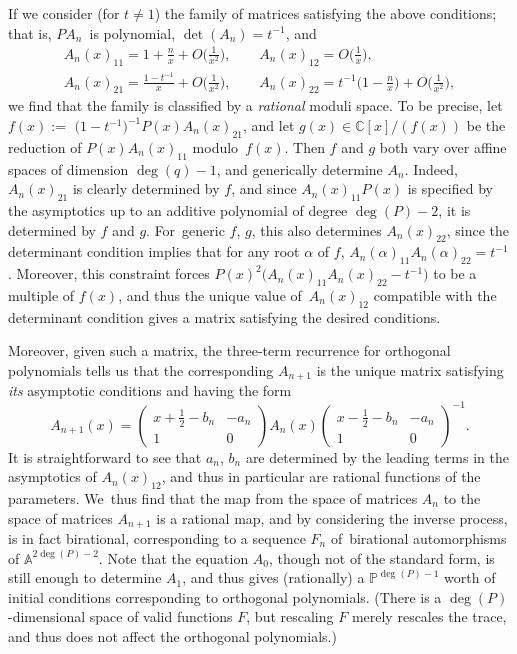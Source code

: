\documentclass[10pt,a4paper]{amsart}
\newcommand{\C}{\mathbb{C}}
\theoremstyle{definition}
\numberwithin{equation}{section}
\begin{document}
If we consider (for $t\ne 1$) the family of matrices satisfying the above
conditions; that is, $PA_n$~is polynomial, $\det(A_n)=t^{-1}$, and
\begin{gather*}
A_n(x)_{11} = 1+\tfrac{n}{x}+O\big(\tfrac{1}{x^2}\big),\qquad
A_n(x)_{12} = O\big(\tfrac{1}{x}\big),\\
A_n(x)_{21} = \tfrac{1-t^{-1}}{x} + O\big(\tfrac{1}{x^2}\big),\qquad
A_n(x)_{22} = t^{-1}\big(1-\tfrac{n}{x}\big)+O\big(\tfrac{1}{x^2}\big),
\end{gather*}
we find that the family is classified by a {\em rational} moduli space. To
be precise, let $f(x):=$ \mbox{$\big(1-t^{-1}\big)^{-1}P(x)A_n(x)_{21}$}, and let $g(x)\in
\C[x]/(f(x))$ be the reduction of $P(x)A_n(x)_{11}$ modu\-lo~$f(x)$. Then
$f$ and $g$ both vary over affine spaces of dimension $\deg(q)-1$, and
generically determine $A_n$. Indeed, $A_n(x)_{21}$ is clearly determined
by $f$, and since $A_n(x)_{11}P(x)$ is specified by the asymptotics up to
an additive polynomial of degree $\deg(P)-2$, it is determined by $f$ and
$g$. For~generic $f$, $g$, this also determines $A_n(x)_{22}$, since the
determinant condition implies that for any root $\alpha$ of $f$,
$A_n(\alpha)_{11}A_n(\alpha)_{22}=t^{-1}$. Moreover, this constraint forces
$P(x)^2 \big(A_n(x)_{11}A_n(x)_{22}-t^{-1}\big)$ to be a multiple of $f(x)$, and
thus the unique value of~$A_n(x)_{12}$ compatible with the determinant
condition gives a matrix satisfying the desired conditions.

Moreover, given such a matrix, the three-term recurrence for orthogonal
polynomials tells us that the corresponding $A_{n+1}$ is the unique matrix
satisfying {\em its} asymptotic conditions and having the form
\[
A_{n+1}(x)=
\begin{pmatrix}
 x+\frac{1}{2}-b_n & -a_n\\
 1 & 0
\end{pmatrix}
A_n(x)
\begin{pmatrix}
 x-\frac{1}{2}-b_n & -a_n\\
 1 & 0
\end{pmatrix}^{-1}.
\]
It is straightforward to see that $a_n$, $b_n$ are determined by the
leading terms in the asymptotics of $A_n(x)_{12}$, and thus in particular
are rational functions of the parameters. We~thus find that the map from
the space of matrices $A_n$ to the space of matrices $A_{n+1}$ is a
rational map, and by considering the inverse process, is in fact
birational, corresponding to a sequence $F_n$ of~bira\-tional automorphisms
of $\mathbb A^{2\deg(P)-2}$. Note that the equation $A_0$, though not of the
standard form, is still enough to determine $A_1$, and thus gives
(rationally) a $\mathbb P^{\deg(P)-1}$ worth of initial conditions corresponding
to orthogonal polynomials. (There is a $\deg(P)$-dimensional space of
valid functions $F$, but rescaling $F$ merely rescales the trace, and thus
does not affect the orthogonal polynomials.)
\end{document}
